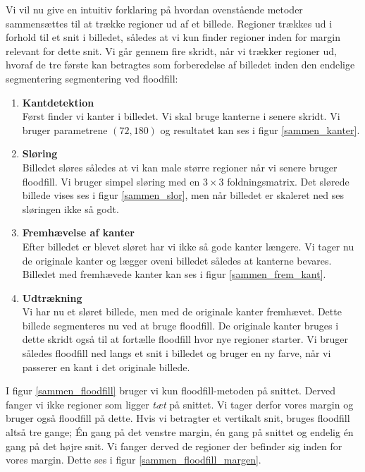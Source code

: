 {
Vi vil nu give en intuitiv forklaring på hvordan ovenstående metoder
sammensættes til at trække regioner ud af et billede.  Regioner trækkes
ud i forhold til et snit i billedet, således at vi kun finder regioner
inden for margin relevant for dette snit. Vi går gennem fire skridt, når
vi trækker regioner ud, hvoraf de tre første kan betragtes som
forberedelse af billedet inden den endelige segmentering segmentering
ved floodfill:

\begin{enumerate}
    \item \textbf{Kantdetektion}\\
Først finder vi kanter i billedet. Vi skal bruge kanterne i senere
skridt. Vi bruger parametrene $(72, 180)$ og resultatet kan ses i figur
\ref{sammen_kanter}.

\item \textbf{Sløring}\\
Billedet sløres således at vi kan male større regioner når vi senere
bruger floodfill. Vi bruger simpel sløring med en $3\times3$
foldningsmatrix. Det slørede billede vises ses i figur
\ref{sammen_slor}, men når billedet er skaleret ned ses sløringen ikke
så godt.

\item \textbf{Fremhævelse af kanter}\\
Efter billedet er blevet sløret har vi ikke så gode kanter længere. Vi
tager nu de originale kanter og lægger oveni billedet således at
kanterne bevares. Billedet med fremhævede kanter kan ses i figur
\ref{sammen_frem_kant}.

\item \textbf{Udtrækning}\\
Vi har nu et sløret billede, men med de originale kanter fremhævet.
Dette billede segmenteres nu ved at bruge floodfill. De originale kanter
bruges i dette skridt også til at fortælle floodfill hvor nye regioner
starter. Vi bruger således floodfill ned langs et snit i billedet og
bruger en ny farve, når vi passerer en kant i det originale billede.
\end{enumerate}

I figur \ref{sammen_floodfill} bruger vi kun floodfill-metoden på
snittet. Derved fanger vi ikke regioner som ligger \emph{tæt} på
snittet. Vi tager derfor vores margin og bruger også floodfill på dette.
Hvis vi betragter et vertikalt snit, bruges floodfill altså tre gange;
Én gang på det venstre margin, én gang på snittet og endelig én gang på
det højre snit. Vi fanger derved de regioner der befinder sig inden for
vores margin. Dette ses i figur \ref{sammen_floodfill_margen}.

}
